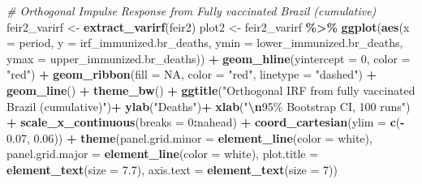 \documentclass[
]{article}
\newenvironment{Shaded}{\begin{snugshade}}{\end{snugshade}}
\newcommand{\AttributeTok}[1]{\textcolor[rgb]{0.13,0.29,0.53}{#1}}
\newcommand{\CommentTok}[1]{\textcolor[rgb]{0.56,0.35,0.01}{\textit{#1}}}
\newcommand{\ConstantTok}[1]{\textcolor[rgb]{0.56,0.35,0.01}{#1}}
\newcommand{\DecValTok}[1]{\textcolor[rgb]{0.00,0.00,0.81}{#1}}
\newcommand{\FloatTok}[1]{\textcolor[rgb]{0.00,0.00,0.81}{#1}}
\newcommand{\FunctionTok}[1]{\textcolor[rgb]{0.13,0.29,0.53}{\textbf{#1}}}
\newcommand{\NormalTok}[1]{#1}
\newcommand{\OtherTok}[1]{\textcolor[rgb]{0.56,0.35,0.01}{#1}}
\newcommand{\SpecialCharTok}[1]{\textcolor[rgb]{0.81,0.36,0.00}{\textbf{#1}}}
\newcommand{\StringTok}[1]{\textcolor[rgb]{0.31,0.60,0.02}{#1}}
\renewenvironment{Shaded}{\begin{mdframed}[ backgroundcolor=shadecolor, linecolor = shadecolor, leftmargin=\dimexpr\leftmargin-2pt\relax, innerleftmargin=1.6pt, innertopmargin=5pt, skipabove=10pt,skipbelow=3pt ]}{\end{mdframed}}
\begin{document}
\begin{Shaded}
\begin{Highlighting}[]
\CommentTok{\# Orthogonal Impulse Response from Fully vaccinated Brazil (cumulative)}
\NormalTok{feir2\_varirf }\OtherTok{\textless{}{-}} \FunctionTok{extract\_varirf}\NormalTok{(feir2)}
\NormalTok{plot2 }\OtherTok{\textless{}{-}}\NormalTok{ feir2\_varirf }\SpecialCharTok{\%\textgreater{}\%} 
  \FunctionTok{ggplot}\NormalTok{(}\FunctionTok{aes}\NormalTok{(}\AttributeTok{x =}\NormalTok{ period, }
             \AttributeTok{y =}\NormalTok{ irf\_immunized.br\_deaths, }
             \AttributeTok{ymin =}\NormalTok{ lower\_immunized.br\_deaths, }
             \AttributeTok{ymax =}\NormalTok{ upper\_immunized.br\_deaths)) }\SpecialCharTok{+}
  \FunctionTok{geom\_hline}\NormalTok{(}\AttributeTok{yintercept =} \DecValTok{0}\NormalTok{, }\AttributeTok{color =} \StringTok{"red"}\NormalTok{) }\SpecialCharTok{+}
  \FunctionTok{geom\_ribbon}\NormalTok{(}\AttributeTok{fill =} \ConstantTok{NA}\NormalTok{, }
              \AttributeTok{color =} \StringTok{"red"}\NormalTok{,}
              \AttributeTok{linetype =} \StringTok{"dashed"}\NormalTok{) }\SpecialCharTok{+}
  \FunctionTok{geom\_line}\NormalTok{() }\SpecialCharTok{+}
  \FunctionTok{theme\_bw}\NormalTok{() }\SpecialCharTok{+}
  \FunctionTok{ggtitle}\NormalTok{(}\StringTok{"Orthogonal IRF from fully vaccinated Brazil (cumulative)"}\NormalTok{)}\SpecialCharTok{+}
  \FunctionTok{ylab}\NormalTok{(}\StringTok{"Deaths"}\NormalTok{)}\SpecialCharTok{+}
  \FunctionTok{xlab}\NormalTok{(}\StringTok{"}\SpecialCharTok{\textbackslash{}n}\StringTok{95\% Bootstrap CI, 100 runs"}\NormalTok{) }\SpecialCharTok{+} 
  \FunctionTok{scale\_x\_continuous}\NormalTok{(}\AttributeTok{breaks =} \DecValTok{0}\SpecialCharTok{:}\NormalTok{nahead) }\SpecialCharTok{+}
  \FunctionTok{coord\_cartesian}\NormalTok{(}\AttributeTok{ylim =} \FunctionTok{c}\NormalTok{(}\SpecialCharTok{{-}} \FloatTok{0.07}\NormalTok{, }\FloatTok{0.06}\NormalTok{)) }\SpecialCharTok{+}
  \FunctionTok{theme}\NormalTok{(}\AttributeTok{panel.grid.minor =} \FunctionTok{element\_line}\NormalTok{(}\AttributeTok{color =} \StringTok{\textquotesingle{}white\textquotesingle{}}\NormalTok{),}
        \AttributeTok{panel.grid.major =} \FunctionTok{element\_line}\NormalTok{(}\AttributeTok{color =} \StringTok{\textquotesingle{}white\textquotesingle{}}\NormalTok{),}
        \AttributeTok{plot.title =} \FunctionTok{element\_text}\NormalTok{(}\AttributeTok{size =} \FloatTok{7.7}\NormalTok{),}
        \AttributeTok{axis.text =} \FunctionTok{element\_text}\NormalTok{(}\AttributeTok{size =} \DecValTok{7}\NormalTok{))}


\end{Highlighting}
\end{Shaded}
\end{document}
